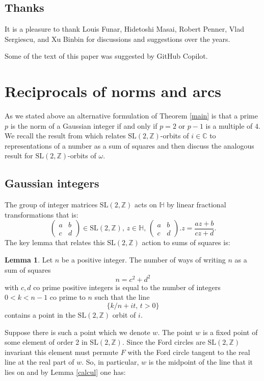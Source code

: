 \documentclass[12pt]{amsart}
\theoremstyle{plain}
\theoremstyle{definition}
\newtheorem{lem}[thm]{Lemma}
\def\HH{\mathbb{H}}
\def\ZZ{\mathbb{Z}}
\def\CC{\mathbb{C}}
\def\sl2{\mathrm{SL}(2, \ZZ)}
\begin{document}
 
\subsection{Thanks}

It is a pleasure to thank Louis Funar, Hidetoshi Masai, Robert
Penner, Vlad Sergiescu, and Xu Binbin for discussions and
suggestions over the years.

Some of the text of this paper was suggested by GitHub
Copilot\cite{copilot, vim_copilot}.

\section{Reciprocals of norms and arcs}

As we stated above an alternative formulation 
of Theorem \ref{main}  is that
a prime $p$ is the norm of a Gaussian integer
if and only if $p=2$ or $p-1$ is a multiple of $4$.
We recall the result from \cite{vlad} 
which relates $\sl2$-orbits of $i \in \CC$
to representations of a number as a sum of squares
and then discuss the analogous result for 
$\sl2$-orbits of $ \omega$.


\subsection{Gaussian integers}

The group of integer matrices $\sl2$  acts on $\HH$ by linear fractional transformations
that is:
$$\begin{pmatrix}
a & b \\
c & d
\end{pmatrix} \in \sl2,\, z\in \HH,\, 
\begin{pmatrix}
a & b \\
c & d
\end{pmatrix}. z = \frac{az + b}{cz + d}.
$$
The key lemma that relates this  $\sl2$ action to sums of squares is:

\begin{lem} \label{squares}
Let $n$ be a positive integer.
The number of  ways of writing $n$  as a  sum of squares
$$n = c^2 + d^2$$
with $c,d$ co prime positive  integers
is equal to the number of  integers $0 < k < n-1$ co prime to $n$
such that the line
$$\{  k/n + i t,\, t >0 \}$$
contains  a point in the $\sl2$  orbit of $i$.
\end{lem}


\proof  Suppose there is such  a point which we denote  $w$.
The point $w$ is a fixed point of some  element of order 2 in $\sl2$.
Since the Ford circles are $\sl2$ invariant
this element must permute $F$ with the Ford circle tangent 
to the real line  at the real part of $w$.
So, in particular, $w$ is the midpoint of the line 
that it lies on 
and by  Lemma \ref{calcul} one has:
\end{document}

